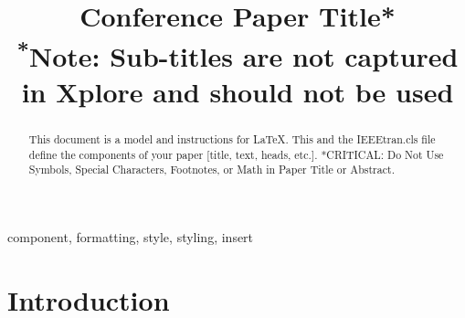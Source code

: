 \documentclass[conference]{IEEEtran}
\begin{document}
\title{Conference Paper Title*\\
{\footnotesize \textsuperscript{*}Note: Sub-titles are not captured in Xplore and
should not be used}
}

\author{
}


\maketitle

\begin{abstract}
This document is a model and instructions for \LaTeX.
This and the IEEEtran.cls file define the components of your paper [title, text, heads, etc.]. *CRITICAL: Do Not Use Symbols, Special Characters, Footnotes, 
or Math in Paper Title or Abstract.
\end{abstract}

\begin{IEEEkeywords}
component, formatting, style, styling, insert
\end{IEEEkeywords}

\section{Introduction}
\end{document}
